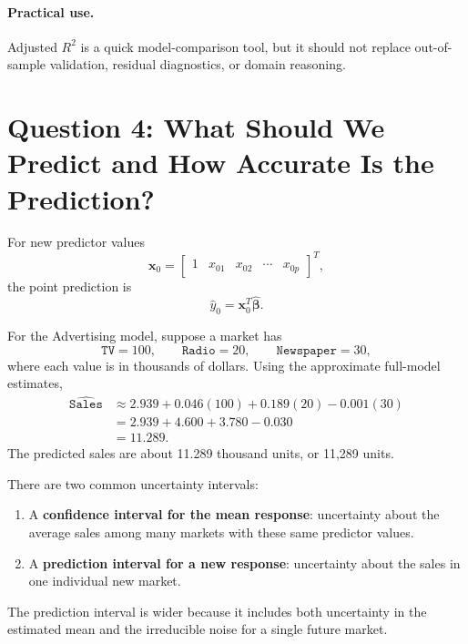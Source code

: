 \paragraph{Practical use.}
Adjusted \(R^2\) is a quick model-comparison tool, but it should not replace out-of-sample validation, residual diagnostics, or domain reasoning.

\section{Question 4: What Should We Predict and How Accurate Is the Prediction?}

For new predictor values
\begin{equation}
  \mathbf{x}_0=\begin{bmatrix}1 & x_{01} & x_{02} & \cdots & x_{0p}\end{bmatrix}^T,
\end{equation}
the point prediction is
\begin{equation}
  \boxed{\widehat{y}_0=\mathbf{x}_0^T\widehat{\boldsymbol{\beta}}.}
\end{equation}

For the Advertising model, suppose a market has
\begin{equation}
  \texttt{TV}=100,\qquad \texttt{Radio}=20,\qquad \texttt{Newspaper}=30,
\end{equation}
where each value is in thousands of dollars.  Using the approximate full-model estimates,
\begin{align}
  \widehat{\texttt{Sales}}
  &\approx 2.939+0.046(100)+0.189(20)-0.001(30)\\
  &=2.939+4.600+3.780-0.030\\
  &=11.289.
\end{align}
The predicted sales are about 11.289 thousand units, or 11,289 units.

There are two common uncertainty intervals:
\begin{enumerate}
  \item A \textbf{confidence interval for the mean response}: uncertainty about the average sales among many markets with these same predictor values.
  \item A \textbf{prediction interval for a new response}: uncertainty about the sales in one individual new market.
\end{enumerate}
The prediction interval is wider because it includes both uncertainty in the estimated mean and the irreducible noise for a single future market.

